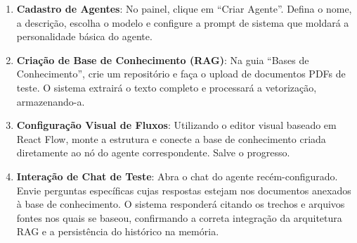 \documentclass[12pt, openright, oneside, a4paper, brazil]{ads-unipac-abntex2}
\begin{document}
\begin{anexosenv}
\begin{enumerate}
    \item \textbf{Cadastro de Agentes}: No painel, clique em ``Criar Agente''. Defina o nome, a descrição, escolha o modelo e configure a prompt de sistema que moldará a personalidade básica do agente.
    
    \item \textbf{Criação de Base de Conhecimento (RAG)}: Na guia ``Bases de Conhecimento'', crie um repositório e faça o upload de documentos PDFs de teste. O sistema extrairá o texto completo e processará a vetorização, armazenando-a.
    
    \item \textbf{Configuração Visual de Fluxos}: Utilizando o editor visual baseado em React Flow, monte a estrutura e conecte a base de conhecimento criada diretamente ao nó do agente correspondente. Salve o progresso.
    
    \item \textbf{Interação de Chat de Teste}: Abra o chat do agente recém-configurado. Envie perguntas específicas cujas respostas estejam nos documentos anexados à base de conhecimento. O sistema responderá citando os trechos e arquivos fontes nos quais se baseou, confirmando a correta integração da arquitetura RAG e a persistência do histórico na memória.
\end{enumerate}

\end{anexosenv}
\end{document}
